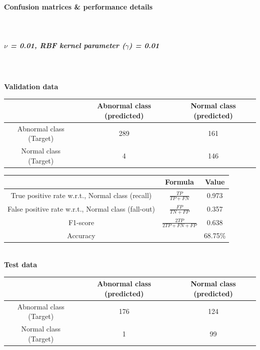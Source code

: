 \documentclass[fleqn]{article}
\newcommand{\myparagraph}[1]{\paragraph{#1}\mbox{}\\}
\begin{document}
\newpage
\myparagraph{Confusion matrices \& performance details}

\subparagraph{$\nu$ = 0.01, RBF kernel parameter ($\gamma$) = 0.01}
~\\\\
\textbf{Validation data}\\

\begin{center}
  \begin{longtable}{ c | c | c  }
	\multicolumn{1}{c}{ } & 
	\multicolumn{1}{c}{Abnormal class (predicted)} & 
	\multicolumn{1}{c}{Normal class (predicted)} \\
    \hline
    Abnormal class (Target)& 289 & 161 \\ \hline
    Normal class (Target)&  4 & 146 \\ \hline
  \end{longtable}
\end{center}    

\begin{center}
  \begin{longtable}{ c | c | c  }
  	\multicolumn{1}{c}{ } & 
	\multicolumn{1}{c}{Formula} & 
	\multicolumn{1}{c}{Value} \\\hline
	True positive rate w.r.t., Normal class (recall)  & $\frac{TP}{TP + FN}$ & 0.973 \\\hline
	False positive rate w.r.t., Normal class (fall-out)  & $\frac{FP}{TN + FP}$ & 0.357\\\hline
	F1-score & $\frac{2TP}{2TP + FN + FP}$ & 0.638\\\hline
	Accuracy  & & 68.75\%\\\hline
  \end{longtable}
\end{center} 


~\\
\textbf{Test data}\\

\begin{center}
  \begin{longtable}{ c | c | c  }
	\multicolumn{1}{c}{ } & 
	\multicolumn{1}{c}{Abnormal class (predicted)} & 
	\multicolumn{1}{c}{Normal class (predicted)} \\
    \hline
    Abnormal class (Target)& 176 & 124 \\ \hline
    Normal class (Target)&  1 & 99 \\ \hline
  \end{longtable}
\end{center}    
\end{document}
